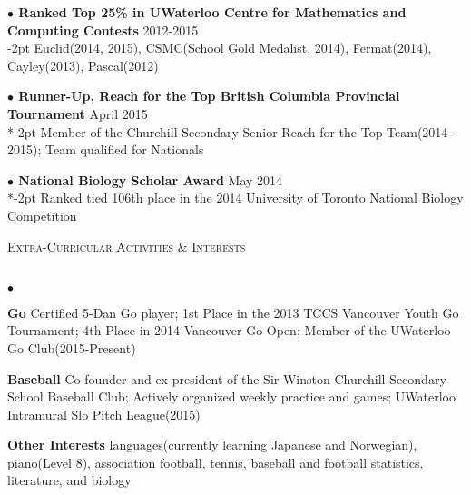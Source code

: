 \documentclass{article}
\newcommand{\lineunder}{\vspace*{-8pt} \\ \hspace*{-18pt} \hrulefill \\}
\newcommand{\header}[1]{{\hspace*{-15pt}\vspace*{6pt} \textsc{#1}} \vspace*{-6pt} \lineunder}
\newenvironment{achievements}{\begin{list}{$\bullet$}{\topsep 0pt \itemsep -2pt}}{\vspace*{4pt}\end{list}}
\newcommand{\award}[3]{\textbf{$\bullet$ \hspace{2bp}#1} \hfill{#2} \\ \vspace{2pt}
}
\begin{document}
\award{Ranked Top 25\% in UWaterloo Centre for Mathematics and Computing Contests}{2012-2015}

\vspace{-2pt}
\hspace{8bp}
Euclid(2014, 2015), CSMC(School Gold Medalist, 2014), Fermat(2014), Cayley(2013), Pascal(2012)

\award{Runner-Up, Reach for the Top British Columbia Provincial Tournament}{April 2015}

\vspace*{-2pt}
\hspace{8bp}
Member of the Churchill Secondary Senior Reach for the Top Team(2014-2015); Team qualified for Nationals

\award{National Biology Scholar Award}{May 2014}

\vspace*{-2pt}
\hspace{8bp}
Ranked tied 106th place in the 2014 University of Toronto National Biology Competition

\vspace*{5pt}

\header{Extra-Curricular Activities \& Interests}
\begin{achievements}
\item \textbf{Go} \hspace{3bp}Certified 5-Dan Go player; 1st Place in the 2013 TCCS Vancouver Youth Go Tournament; 4th Place in 2014 Vancouver Go Open; Member of the UWaterloo Go Club(2015-Present)
\item \textbf{Baseball}	\hspace{3bp}Co-founder and ex-president of the Sir Winston Churchill Secondary School Baseball Club; Actively organized weekly practice and games; UWaterloo Intramural Slo Pitch League(2015)
\item \textbf{Other Interests} \hspace{3bp}languages(currently learning Japanese and Norwegian), piano(Level 8), association football, tennis, baseball and football statistics, literature, and biology
\end{achievements}
\end{document}
